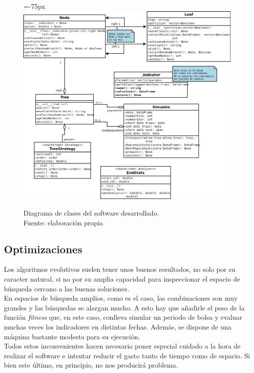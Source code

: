      	\begin{figure}[H]
    		\centering\leftskip=-75px
    		\includegraphics[scale=0.60]{imagenes/diagramaClases.png}
    	    \caption[Diagrama de clases del software desarrollado.]{Diagrama de clases del software desarrollado.\\ Fuente: elaboraci\'on propia}
    		\label{fig:diagclases}
	   \end{figure}

\subsection{Optimizaciones}\label{sec:timeimprove}

Los algoritmos evolutivos suelen tener unos buenos resultados, no solo por su caracter natural, si no por su amplia capacidad para inspeccionar el espacio de b\'usqueda cercano a las buenas soluciones.\\

En espacios de b\'usqueda amplios, como es el caso, las combinaciones son muy grandes y las b\'usquedas se alargan mucho. A esto hay que a\~nadirle el peso de la funci\'on \textit{fitness} que, en este caso, conlleva simular un periodo de bolsa y evaluar muchas veces los indicadores en distintas fechas. Adem\'as, se dispone de una m\'aquina bastante modesta para su ejecuci\'on.\\

Todos estos inconvenientes hacen necesario poner especial cuidado a la hora de realizar el software e intentar reducir el gasto tanto de tiempo como de espacio. Si bien este \'ultimo, en principio, no nos producir\'a problema.\\

